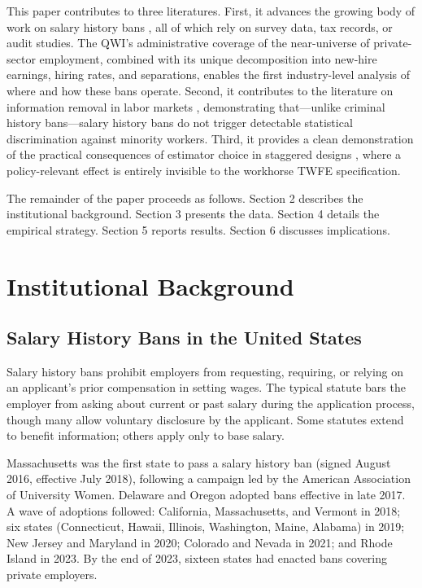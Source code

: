 \documentclass[12pt]{article}
\begin{document}
This paper contributes to three literatures. First, it advances the growing body of work on salary history bans \citep{Agan2022, BarachHorton2021, Sinha2024, Hansen2020}, all of which rely on survey data, tax records, or audit studies. The QWI's administrative coverage of the near-universe of private-sector employment, combined with its unique decomposition into new-hire earnings, hiring rates, and separations, enables the first industry-level analysis of where and how these bans operate. Second, it contributes to the literature on information removal in labor markets \citep{DoleacHansen2020, AganStarr2018, Bartik2018}, demonstrating that---unlike criminal history bans---salary history bans do not trigger detectable statistical discrimination against minority workers. Third, it provides a clean demonstration of the practical consequences of estimator choice in staggered designs \citep{CallawaySantanna2021, SunAbraham2021, Roth2023}, where a policy-relevant effect is entirely invisible to the workhorse TWFE specification.

The remainder of the paper proceeds as follows. Section 2 describes the institutional background. Section 3 presents the data. Section 4 details the empirical strategy. Section 5 reports results. Section 6 discusses implications.


\section{Institutional Background}

\subsection{Salary History Bans in the United States}

Salary history bans prohibit employers from requesting, requiring, or relying on an applicant's prior compensation in setting wages. The typical statute bars the employer from asking about current or past salary during the application process, though many allow voluntary disclosure by the applicant. Some statutes extend to benefit information; others apply only to base salary.

Massachusetts was the first state to pass a salary history ban (signed August 2016, effective July 2018), following a campaign led by the American Association of University Women. Delaware and Oregon adopted bans effective in late 2017. A wave of adoptions followed: California, Massachusetts, and Vermont in 2018; six states (Connecticut, Hawaii, Illinois, Washington, Maine, Alabama) in 2019; New Jersey and Maryland in 2020; Colorado and Nevada in 2021; and Rhode Island in 2023. By the end of 2023, sixteen states had enacted bans covering private employers.
\end{document}
